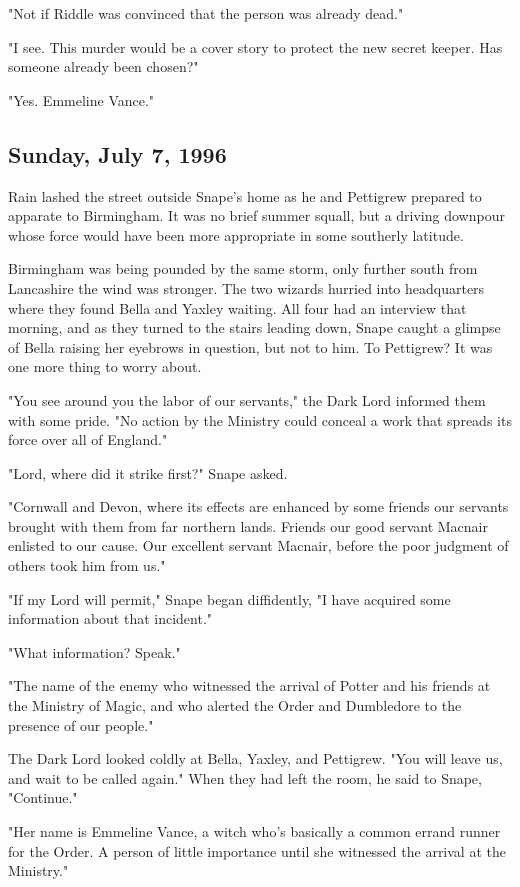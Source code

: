 "Not if Riddle was convinced that the person was already dead."

"I see. This murder would be a cover story to protect the new secret keeper. Has someone already been chosen?"

"Yes. Emmeline Vance."

\subsection{Sunday, July 7, 1996}

Rain lashed the street outside Snape's home as he and Pettigrew prepared to apparate to Birmingham. It was no brief summer squall, but a driving downpour whose force would have been more appropriate in some southerly latitude.

Birmingham was being pounded by the same storm, only further south from Lancashire the wind was stronger. The two wizards hurried into headquarters where they found Bella and Yaxley waiting. All four had an interview that morning, and as they turned to the stairs leading down, Snape caught a glimpse of Bella raising her eyebrows in question, but not to him. To Pettigrew? It was one more thing to worry about.

"You see around you the labor of our servants," the Dark Lord informed them with some pride. "No action by the Ministry could conceal a work that spreads its force over all of England."

"Lord, where did it strike first?" Snape asked.

"Cornwall and Devon, where its effects are enhanced by some friends our servants brought with them from far northern lands. Friends our good servant Macnair enlisted to our cause. Our excellent servant Macnair, before the poor judgment of others took him from us."

"If my Lord will permit," Snape began diffidently, "I have acquired some information about that{\el} incident."

"What information? Speak."

"The name of the enemy who witnessed the arrival of Potter and his friends at the Ministry of Magic, and who alerted the Order and Dumbledore to the presence of our people."

The Dark Lord looked coldly at Bella, Yaxley, and Pettigrew. "You will leave us, and wait to be called again." When they had left the room, he said to Snape, "Continue."

"Her name is Emmeline Vance, a witch who's basically a common errand runner for the Order. A person of little importance until she witnessed the arrival at the Ministry."

